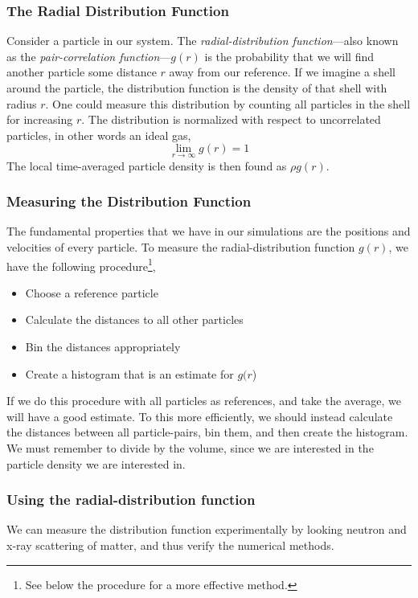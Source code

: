 \documentclass[11pt]{article}
\numberwithin{equation}{section}
\numberwithin{figure}{section}
\newcommand{\ita}[1]{\textit{#1}}
\begin{document}
\subsubsection{The Radial Distribution Function}
Consider a particle in our system. 
The \ita{radial-distribution function}---also known as 
the \ita{pair-correlation function}---$g(r)$ 
is the probability that we will find another particle some distance $r$
away from our reference.
If we imagine a shell around the particle, the distribution function is
the density of that shell with radius $r$.
One could measure this distribution by counting all particles
in the shell for increasing $r$.
The distribution is normalized with respect to uncorrelated particles,
in other words an ideal gas,
\begin{equation}
    \lim_{r\rightarrow\infty} g(r) = 1
\end{equation}
The local time-averaged particle density is then found as $\rho g(r)$.

\subsubsection{Measuring the Distribution Function}
The fundamental properties that we have in our simulations
are the positions and velocities of every particle.
To measure the radial-distribution function $g(r)$, we
have the following procedure\footnote{See below the procedure
for a more effective method.
},
\begin{itemize}
    \item Choose a reference particle
    \item Calculate the distances to all other particles
    \item Bin the distances appropriately
    \item Create a histogram that is an estimate for $g(r$)
\end{itemize}
If we do this procedure with all particles as references,
and take the average,
we will have a good estimate. To this more efficiently,
we should instead calculate the distances between all particle-pairs,
bin them, and then create the histogram.
We must remember to divide by the volume, since we are interested in the
particle density we are interested in.

\subsubsection{Using the radial-distribution function}
We can measure the distribution function experimentally
by looking neutron and x-ray scattering of matter,
and thus verify the numerical methods.
\end{document}
